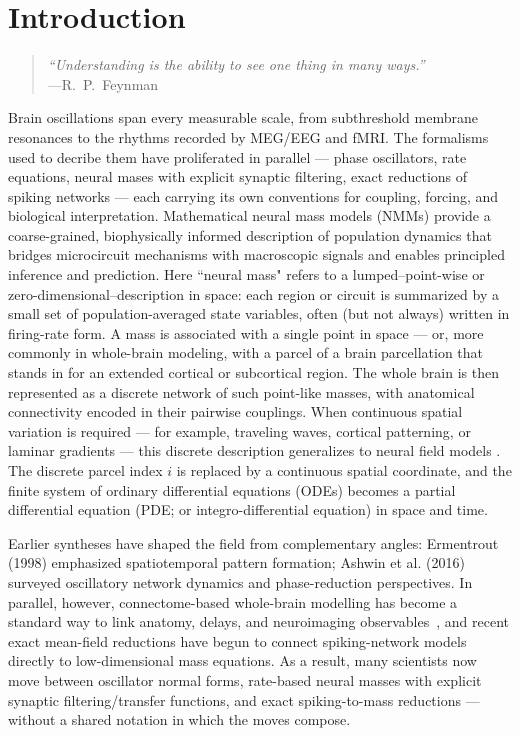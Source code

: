 \documentclass[12pt]{article}
\numberwithin{equation}{section}
\newcommand{\rev}[1]{\begingroup\color{blue}#1\endgroup}
\begin{document}
\setcounter{tocdepth}{2}
\tableofcontents

\clearpage


\section{Introduction} 

\begin{quote}
\emph{``Understanding is the ability to see one thing in many ways.''}\\[4pt]
\hfill ---R.~P.~Feynman
\end{quote}

  \rev{Brain oscillations span every measurable scale, from subthreshold membrane resonances to the rhythms recorded by MEG/EEG and fMRI. The formalisms used to decribe them have proliferated in parallel — phase oscillators, rate equations, neural mases with explicit synaptic filtering, exact reductions of spiking networks — each carrying its own conventions for coupling, forcing, and biological interpretation. Mathematical neural mass models (NMMs) provide a coarse-grained, biophysically informed description of population dynamics that bridges microcircuit mechanisms with macroscopic signals and enables principled inference and prediction. Here ``neural mass" refers to a lumped–point-wise or zero-dimensional–description in space: each region or circuit is summarized by a small set of population-averaged state variables, often (but not always) written in firing-rate form. A mass is associated with a single point in space — or, more commonly in whole-brain modeling, with a parcel of a brain parcellation that stands in for an extended cortical or subcortical region. The whole brain is then represented as a discrete network of such point-like masses, with anatomical connectivity encoded in their pairwise couplings. When continuous spatial variation is required — for example, traveling waves, cortical patterning, or laminar gradients — this discrete description generalizes to neural field models \cite{coombes2014}. The discrete parcel index $i$ is replaced by a continuous spatial coordinate, and the finite system of ordinary differential equations (ODEs) becomes a partial differential equation (PDE; or integro-differential equation) in space and time.
  
Earlier syntheses have shaped the field from complementary angles: Ermentrout (1998) \cite{ermentrout1998neural} emphasized spatiotemporal pattern formation; Ashwin et al. (2016) \cite{ashwin2016mathematical} surveyed oscillatory network dynamics and phase-reduction perspectives. In parallel, however, connectome-based whole-brain modelling has become a standard way to link anatomy, delays, and neuroimaging observables~\cite{deco_dynamic_2008,cabral_role_2011,DavidFriston2003,castaldo2023multi,sanchez-todoPhysicalNeuralMass2023,breakspearDynamicModelsLargescale2017}, and recent exact mean-field reductions have begun to connect spiking-network models directly to low-dimensional mass equations. As a result, many scientists now move between oscillator normal forms, rate-based neural masses with explicit synaptic filtering/transfer functions, and exact spiking-to-mass reductions — without a shared notation in which the moves compose.}
\end{document}
